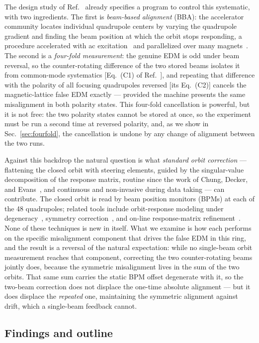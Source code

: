 \documentclass[aps,prab,reprint,superscriptaddress,nofootinbib]{revtex4-2}
\begin{document}
The design study of Ref.~\cite{omarov} already specifies a program to control
this systematic, with two ingredients.  The first is \emph{beam-based
alignment} (BBA): the accelerator community locates individual quadrupole
centers by varying the quadrupole gradient and finding the beam position at
which the orbit stops responding, a procedure accelerated with ac
excitation~\cite{marti} and parallelized over many magnets~\cite{huang}.  The
second is a \emph{four-fold measurement}: the genuine EDM is odd under beam
reversal, so the counter-rotating difference of the two stored beams isolates
it from common-mode systematics [Eq.~(C1) of Ref.~\cite{omarov}], and
repeating that difference with the polarity of all focusing quadrupoles
reversed [its Eq.~(C2)] cancels the magnetic-lattice false EDM exactly ---
provided the machine presents the same misalignment in both polarity states.
This four-fold cancellation is powerful, but it is not free: the two polarity
states cannot be stored at once, so the experiment must be run a second time
at reversed polarity, and, as we show in Sec.~\ref{sec:fourfold}, the
cancellation is undone by any change of alignment between the two runs.

Against this backdrop the natural question is what \emph{standard orbit
correction} --- flattening the closed orbit with steering elements, guided by
the singular-value decomposition of the response matrix, routine since the
work of Chung, Decker, and Evans~\cite{chung1993}, and continuous and
non-invasive during data taking --- can contribute.  The closed orbit is read
by beam position monitors (BPMs) at each of the 48 quadrupoles; related tools
include orbit-response modeling under degeneracy~\cite{wegscheider}, symmetry
correction~\cite{mirza}, and on-line response-matrix
refinement~\cite{ziemann}.  None of these techniques is new in itself.  What
we examine is how each performs on the specific misalignment component that
drives the false EDM in this ring, and the result is a reversal of the natural
expectation: while no single-beam orbit measurement reaches that component,
correcting the two counter-rotating beams jointly does, because the symmetric
misalignment lives in the sum of the two orbits.  That same sum carries the
static BPM offset degenerate with it, so the two-beam correction does not
displace the one-time absolute alignment --- but it does displace the
\emph{repeated} one, maintaining the symmetric alignment against drift, which a
single-beam feedback cannot.

\subsection{Findings and outline}
\label{sec:outline}
\end{document}
